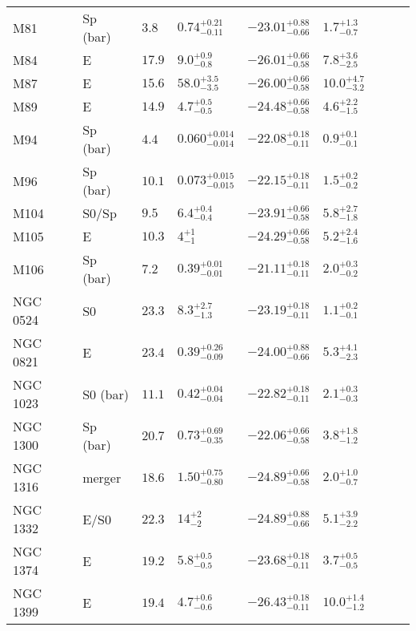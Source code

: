 \begin{table*}
\begin{center}
\begin{tabular}{llllllrll}
M81  &  Sp (bar)  &  $3.8$  &  $0.74_{-0.11}^{+0.21}$   &  $-23.01_{-0.66}^{+0.88}$   &  $1.7_{-0.7}^{+1.3}$   &   \\ 
M84  &  E  &  $17.9$  &  $9.0_{-0.8}^{+0.9}$   &  $-26.01_{-0.58}^{+0.66}$   &  $7.8_{-2.5}^{+3.6}$   &   \\ 
M87  &  E  &  $15.6$  &  $58.0_{-3.5}^{+3.5}$   &  $-26.00_{-0.58}^{+0.66}$   &  $10.0_{-3.2}^{+4.7}$   &   \\ 
M89  &  E  &  $14.9$  &  $4.7_{-0.5}^{+0.5}$   &  $-24.48_{-0.58}^{+0.66}$   &  $4.6_{-1.5}^{+2.2}$   &   \\ 
M94  &  Sp (bar)  &  $4.4$  &  $0.060_{-0.014}^{+0.014}$   &  $-22.08_{-0.11}^{+0.18}$   &  $0.9_{-0.1}^{+0.1}$   &   \\ 
M96  &  Sp (bar)  &  $10.1$  &  $0.073_{-0.015}^{+0.015}$   &  $-22.15_{-0.11}^{+0.18}$   &  $1.5_{-0.2}^{+0.2}$   &   \\ 
M104  &  S0/Sp  &  $9.5$  &  $6.4_{-0.4}^{+0.4}$   &  $-23.91_{-0.58}^{+0.66}$   &  $5.8_{-1.8}^{+2.7}$   &   \\ 
M105  &  E  &  $10.3$  &  $4_{-1}^{+1}$   &  $-24.29_{-0.58}^{+0.66}$   &  $5.2_{-1.6}^{+2.4}$   &   \\ 
M106  &  Sp (bar)  &  $7.2$  &  $0.39_{-0.01}^{+0.01}$   &  $-21.11_{-0.11}^{+0.18}$   &  $2.0_{-0.2}^{+0.3}$   &   \\ 
NGC 0524  &  S0  &  $23.3$  &  $8.3_{-1.3}^{+2.7}$   &  $-23.19_{-0.11}^{+0.18}$   &  $1.1_{-0.1}^{+0.2}$   &   \\ 
NGC 0821  &  E  &  $23.4$  &  $0.39_{-0.09}^{+0.26}$   &  $-24.00_{-0.66}^{+0.88}$   &  $5.3_{-2.3}^{+4.1}$   &   \\ 
NGC 1023  &  S0 (bar)  &  $11.1$  &  $0.42_{-0.04}^{+0.04}$   &  $-22.82_{-0.11}^{+0.18}$   &  $2.1_{-0.3}^{+0.3}$   &   \\ 
NGC 1300  &  Sp (bar)  &  $20.7$  &  $0.73_{-0.35}^{+0.69}$   &  $-22.06_{-0.58}^{+0.66}$   &  $3.8_{-1.2}^{+1.8}$   &   \\ 
NGC 1316  &  merger  &  $18.6$  &  $1.50_{-0.80}^{+0.75}$   &  $-24.89_{-0.58}^{+0.66}$   &  $2.0_{-0.7}^{+1.0}$   &   \\ 
NGC 1332  &  E/S0  &  $22.3$  &  $14_{-2}^{+2}$   &  $-24.89_{-0.66}^{+0.88}$   &  $5.1_{-2.2}^{+3.9}$   &   \\ 
NGC 1374  &  E  &  $19.2$  &  $5.8_{-0.5}^{+0.5}$   &  $-23.68_{-0.11}^{+0.18}$   &  $3.7_{-0.5}^{+0.5}$   &   \\ 
NGC 1399  &  E  &  $19.4$  &  $4.7_{-0.6}^{+0.6}$   &  $-26.43_{-0.11}^{+0.18}$   &  $10.0_{-1.2}^{+1.4}$   &   \\ 

\end{tabular}
\end{center}
\end{table*}
